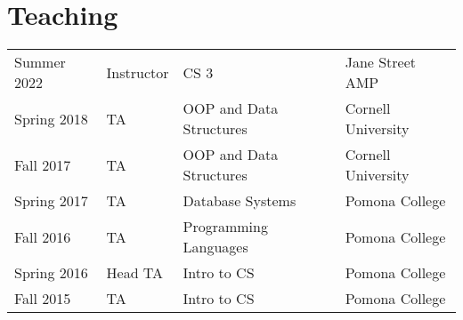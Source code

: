 \documentclass[]{deedy-resume-openfont}
\begin{document}
\begin{minipage}[t]{0.66\textwidth}



\section{Teaching} 

\begin{tabular}{llll}
  
    Summer 2022 & Instructor & CS 3 & Jane Street AMP \\
  
    Spring 2018 & TA & OOP and Data Structures & Cornell University \\
  
    Fall 2017 & TA & OOP and Data Structures & Cornell University \\
  
    Spring 2017 & TA & Database Systems & Pomona College \\
  
    Fall 2016 & TA & Programming Languages & Pomona College \\
  
    Spring 2016 & Head TA & Intro to CS & Pomona College \\
  
    Fall 2015 & TA & Intro to CS & Pomona College \\
  
\end{tabular}


\sectionsep

\end{minipage} 
\end{document}
